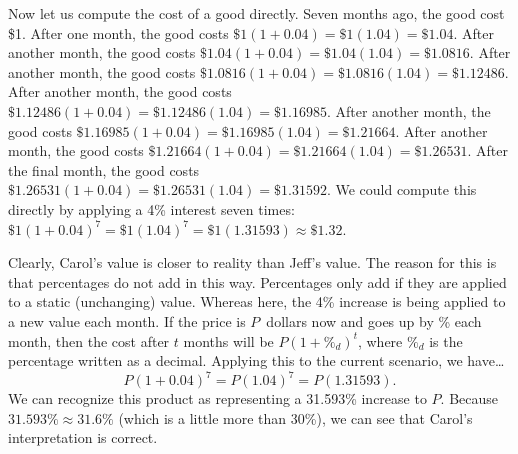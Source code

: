 \documentclass[11pt,letterpaper]{article}
\begin{document}
Now let us compute the cost of a good directly. Seven months ago, the good cost \$1. After one month, the good costs $\$1(1+0.04)= \$1(1.04)= \$1.04$. After another month, the good costs $\$1.04(1+0.04)= \$1.04(1.04)= \$1.0816$. After another month, the good costs $\$1.0816(1+0.04)= \$1.0816(1.04)= \$1.12486$. After another month, the good costs $\$1.12486(1+0.04)= \$1.12486(1.04)= \$1.16985$. After another month, the good costs $\$1.16985(1+0.04)= \$1.16985(1.04)= \$1.21664$. After another month, the good costs $\$1.21664(1+0.04)= \$1.21664(1.04)= \$1.26531$. After the final month, the good costs $\$1.26531(1+0.04)= \$1.26531(1.04)= \$1.31592$. We could compute this directly by applying a 4\% interest seven times: $\$1(1 + 0.04)^7= \$1 (1.04)^7= \$1 (1.31593) \approx \$1.32$. \pspace

Clearly, Carol's value is closer to reality than Jeff's value. The reason for this is that percentages do not add in this way. Percentages only add if they are applied to a static (unchanging) value. Whereas here, the 4\% increase is being applied to a new value each month. If the price is $P$~dollars now and goes up by \% each month, then the cost after $t$ months will be $P(1 + \%_d)^t$, where $\%_d$ is the percentage written as a decimal. Applying this to the current scenario, we have\dots \pspace
	\[
	P(1 + 0.04)^7= P(1.04)^7= P(1.31593).
	\] \pspace
We can recognize this product as representing a 31.593\% increase to $P$. Because $31.593\% \approx 31.6\%$ (which is a little more than 30\%), we can see that Carol's interpretation is correct. \pspace
\end{document}
